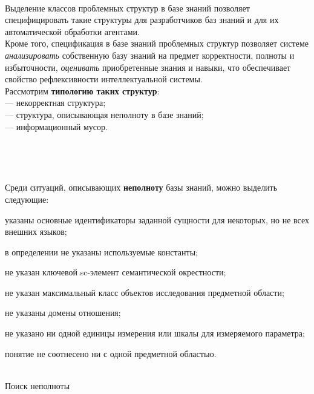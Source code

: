 \begin{frame}{\\}
	\topline
	\justifying
	Выделение классов проблемных структур в базе знаний позволяет специфицировать такие структуры для разработчиков баз знаний и для их автоматической обработки агентами.\\
	Кроме того, спецификация в базе знаний проблемных структур позволяет системе \textit{анализировать} собственную базу знаний на предмет корректности, полноты и избыточности, \textit{оценивать} приобретенные знания и навыки, что обеспечивает свойство рефлексивности интеллектуальной системы.\\
	Рассмотрим \textbf{типологию таких структур}:\\
	--- некорректная структура;\\
	--- структура, описывающая неполноту в базе знаний;\\
	--- информационный мусор.\\
\end{frame}

\begin{frame}{\\}
	\topline
	\justifying
	\begin{SCn}
		
		
	\end{SCn}
\end{frame}

\begin{frame}{\\}
	\topline
	\justifying
	
	Среди ситуаций, описывающих \textbf{неполноту} базы знаний, можно выделить следующие:
		\begin{textitemize}
			\item указаны основные идентификаторы заданной сущности для некоторых, но не всех внешних языков;
			\item в определении не указаны используемые константы;
			\item не указан ключевой sc-элемент семантической окрестности;
			\item не указан максимальный класс объектов исследования предметной области;
			\item не указаны домены отношения;
			\item не указано ни одной единицы измерения или шкалы для измеряемого	параметра;
			\item понятие не соотнесено ни с одной предметной областью.
		\end{textitemize}
\end{frame}

\begin{frame}{\\Поиск неполноты}%
	\topline
	\justifying
	\begin{SCn}
		
	\end{SCn}
\end{frame}